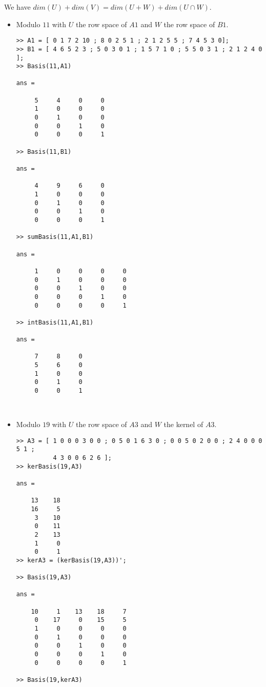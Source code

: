 \documentclass[11pt]{article}
\begin{document}
We have $dim(U)+dim(V)=dim(U+W)+dim(U\cap W)$.
\begin{itemize}
\item Modulo $11$ with $U$ the row space of $A1$ and $W$ the row space of $B1$.
\begin{verbatim}
>> A1 = [ 0 1 7 2 10 ; 8 0 2 5 1 ; 2 1 2 5 5 ; 7 4 5 3 0];
>> B1 = [ 4 6 5 2 3 ; 5 0 3 0 1 ; 1 5 7 1 0 ; 5 5 0 3 1 ; 2 1 2 4 0 ];
>> Basis(11,A1)

ans =

     5     4     0     0
     1     0     0     0
     0     1     0     0
     0     0     1     0
     0     0     0     1

>> Basis(11,B1)

ans =

     4     9     6     0
     1     0     0     0
     0     1     0     0
     0     0     1     0
     0     0     0     1

>> sumBasis(11,A1,B1)

ans =

     1     0     0     0     0
     0     1     0     0     0
     0     0     1     0     0
     0     0     0     1     0
     0     0     0     0     1

>> intBasis(11,A1,B1)

ans =

     7     8     0
     5     6     0
     1     0     0
     0     1     0
     0     0     1



\end{verbatim}

\item Modulo $19$ with $U$ the row space of $A3$ and $W$ the kernel of $A3$.

\begin{verbatim}
>> A3 = [ 1 0 0 0 3 0 0 ; 0 5 0 1 6 3 0 ; 0 0 5 0 2 0 0 ; 2 4 0 0 0 5 1 ;
          4 3 0 0 6 2 6 ];
>> kerBasis(19,A3)

ans =

    13    18
    16     5
     3    10
     0    11
     2    13
     1     0
     0     1
>> kerA3 = (kerBasis(19,A3))';

>> Basis(19,A3)

ans =

    10     1    13    18     7
     0    17     0    15     5
     1     0     0     0     0
     0     1     0     0     0
     0     0     1     0     0
     0     0     0     1     0
     0     0     0     0     1

>> Basis(19,kerA3)


\end{verbatim}
\end{itemize}
\end{document}
